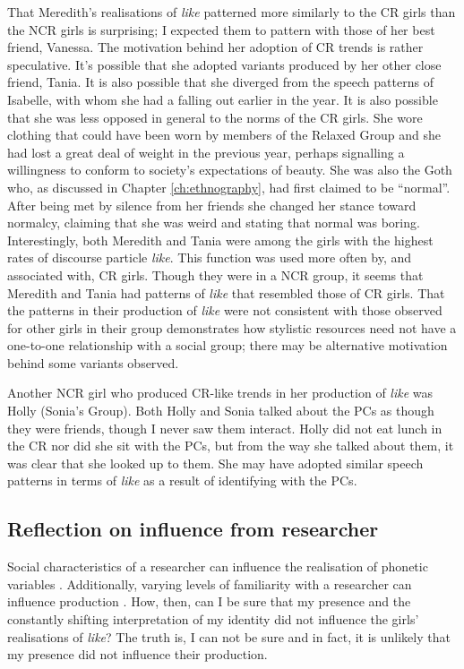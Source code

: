 That Meredith's realisations of \textit{like} patterned more similarly to the CR girls than the NCR girls is surprising; I expected them to pattern with those of her best friend, Vanessa.  The motivation behind her adoption of CR trends is rather speculative.  It's possible that she adopted variants produced by her other close friend, Tania.  It is also possible that she diverged from the speech patterns of Isabelle, with whom she had a falling out earlier in the year.  It is also possible that she was less opposed in general to the norms of the CR girls.  She wore clothing that could have been worn by members of the Relaxed Group and she had lost a great deal of weight in the previous year, perhaps signalling a willingness to conform to society's expectations of beauty.  She was also the Goth who, as discussed in Chapter \ref{ch:ethnography}, had first claimed to be ``normal''.  After being met by silence from her friends she changed her stance toward normalcy, claiming that she was weird and stating that normal was boring.  Interestingly, both Meredith and Tania were among the girls with the highest rates of discourse particle \textit{like}.  This function was used more often by, and associated with, CR girls.  Though they were in a NCR group, it seems that Meredith and Tania had patterns of \textit{like} that resembled those of CR girls.  That the patterns in their production of \textit{like} were not consistent with those observed for other girls in their group demonstrates how stylistic resources need not have a one-to-one relationship with a social group; there may be alternative motivation behind some variants observed.  

Another NCR girl who produced CR-like trends in her production of \textit{like} was Holly (Sonia's Group).  Both Holly and Sonia talked about the PCs as though they were friends, though I never saw them interact.  Holly did not eat lunch in the CR nor did she sit with the PCs, but from the way she talked about them, it was clear that she looked up to them. She may have adopted similar speech patterns in terms of \textit{like} as a result of identifying with the PCs.




\subsection{Reflection on influence from researcher}

Social characteristics of a researcher can influence the realisation of phonetic variables \cite{rickfordetal1994}.  Additionally, varying levels of familiarity with a researcher can influence production \cite{cukoravilabailey}.  How, then, can I be sure that my presence and the constantly shifting interpretation of my identity did not influence the girls' realisations of \textit{like}?  The truth is, I can not be sure and in fact, it is unlikely that my presence did not influence their production.

